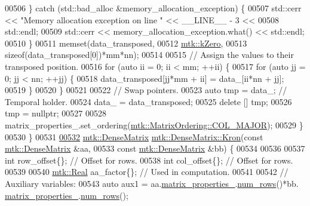\begin{DoxyCode}
00506     \} \textcolor{keywordflow}{catch} (std::bad\_alloc &memory\_allocation\_exception) \{
00507       std::cerr << \textcolor{stringliteral}{"Memory allocation exception on line "} << \_\_LINE\_\_ - 3 <<
00508         std::endl;
00509       std::cerr << memory\_allocation\_exception.what() << std::endl;
00510     \}
00511     memset(data\_transposed,
00512           \hyperlink{group__c01-roots_ga59a451a5fae30d59649bcda274fea271}{mtk::kZero},
00513           \textcolor{keyword}{sizeof}(data\_transposed[0])*mm*nn);
00514 
00515     \textcolor{comment}{// Assign the values to their transposed position.}
00516     \textcolor{keywordflow}{for} (\textcolor{keyword}{auto} ii = 0; ii < mm; ++ii) \{
00517       \textcolor{keywordflow}{for} (\textcolor{keyword}{auto} jj = 0; jj < nn; ++jj) \{
00518         data\_transposed[jj*mm + ii] = data\_[ii*nn + jj];
00519       \}
00520     \}
00521 
00522     \textcolor{comment}{// Swap pointers.}
00523     \textcolor{keyword}{auto} tmp = data\_; \textcolor{comment}{// Temporal holder.}
00524     data\_ = data\_transposed;
00525     \textcolor{keyword}{delete} [] tmp;
00526     tmp = \textcolor{keyword}{nullptr};
00527 
00528     matrix\_properties\_.set\_ordering(\hyperlink{namespacemtk_ga622801bd9f912d0f976c3e383f5f581ca34d2765ffc490951febdcca04bc4f7cd}{mtk::MatrixOrdering::COL\_MAJOR});
00529   \}
00530 \}
00531 
\hypertarget{mtk__dense__matrix_8cc_source_l00532}{}\hyperlink{classmtk_1_1DenseMatrix_a01d3d8bd502870f93bf3a88a0cc5fb49}{00532} \hyperlink{classmtk_1_1DenseMatrix}{mtk::DenseMatrix} \hyperlink{classmtk_1_1DenseMatrix_a01d3d8bd502870f93bf3a88a0cc5fb49}{mtk::DenseMatrix::Kron}(\textcolor{keyword}{const} 
      \hyperlink{classmtk_1_1DenseMatrix}{mtk::DenseMatrix} &aa,
00533                                         \textcolor{keyword}{const} \hyperlink{classmtk_1_1DenseMatrix}{mtk::DenseMatrix} &bb) \{
00534 
00536 
00537   \textcolor{keywordtype}{int} row\_offset\{\}; \textcolor{comment}{// Offset for rows.}
00538   \textcolor{keywordtype}{int} col\_offset\{\}; \textcolor{comment}{// Offset for rows.}
00539 
00540   \hyperlink{group__c01-roots_gac080bbbf5cbb5502c9f00405f894857d}{mtk::Real} aa\_factor\{\};    \textcolor{comment}{// Used in computation.}
00541 
00542   \textcolor{comment}{// Auxiliary variables:}
00543   \textcolor{keyword}{auto} aux1 = aa.\hyperlink{classmtk_1_1DenseMatrix_a481c8d09af685a5ba67acefdcaa810cc}{matrix\_properties\_}.\hyperlink{classmtk_1_1Matrix_ab308b25b48e4fcd39fc60e0c3fc66dea}{num\_rows}()*bb.
      \hyperlink{classmtk_1_1DenseMatrix_a481c8d09af685a5ba67acefdcaa810cc}{matrix\_properties\_}.\hyperlink{classmtk_1_1Matrix_ab308b25b48e4fcd39fc60e0c3fc66dea}{num\_rows}();

\end{DoxyCode}
